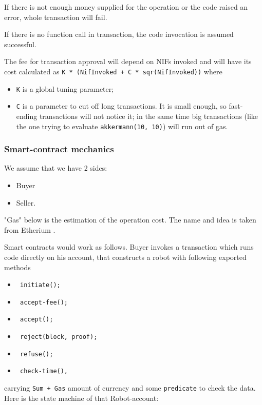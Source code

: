 If there is not enough money supplied for the operation or the code raised an error, whole transaction will fail.

If there is no function call in transaction, the code invocation is assumed successful.

The fee for transaction approval will depend on NIFs invoked and will have its cost calculated as \verb|K * (NifInvoked + C * sqr(NifInvoked))| where
\begin{itemize}
    \item \verb|K| is a global tuning parameter;
    \item \verb|C| is a parameter to cut off long transactions. It is small enough, so fast-ending transactions will not notice it; in the same time big transactions (like the one trying to evaluate \verb|akkermann(10, 10)|) will run out of gas.
\end{itemize}

\subsubsection{Smart-contract mechanics}

We assume that we have 2 sides:
\begin{itemize}
  \item Buyer
  \item Seller.
\end{itemize}

"Gas" below is the estimation of the operation cost. The name and idea is taken from Etherium \cite{eth}.

Smart contracts would work as follows. Buyer invokes a transaction which runs code directly on his account, that constructs a robot with following exported methods

\begin{itemize}
  \item \begin{verbatim} initiate(); \end{verbatim}
  \item \begin{verbatim} accept-fee(); \end{verbatim}
  \item \begin{verbatim} accept(); \end{verbatim}
  \item \begin{verbatim} reject(block, proof); \end{verbatim}
  \item \begin{verbatim} refuse(); \end{verbatim}
  \item \begin{verbatim} check-time(), \end{verbatim}
\end{itemize}
carrying \verb|Sum + Gas| amount of currency and some \verb|predicate| to check the data.
\newline
\newline
Here is the state machine of that Robot-account:

